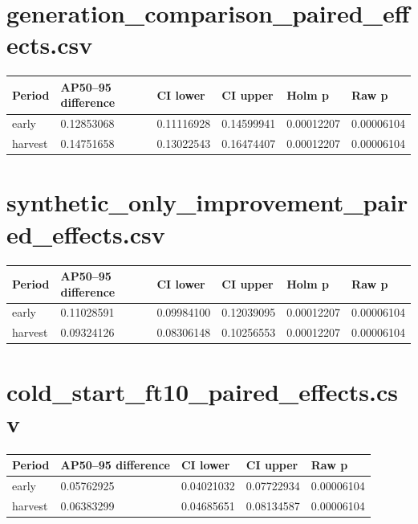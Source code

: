 \documentclass{article}
\begin{document}
\section*{generation\_comparison\_paired\_effects.csv}
\begin{lrbox}{\resulttable}\begin{tabular}{llllll}
\toprule
Period & AP50--95 difference & CI lower & CI upper & Holm p & Raw p \\
\midrule
early & 0.12853068 & 0.11116928 & 0.14599941 & 0.00012207 & 0.00006104 \\
harvest & 0.14751658 & 0.13022543 & 0.16474407 & 0.00012207 & 0.00006104 \\
\bottomrule
\end{tabular}\end{lrbox}
\noindent\ifdim\wd\resulttable>\linewidth\resizebox{.99\linewidth}{!}{\usebox{\resulttable}}\else\usebox{\resulttable}\fi
\clearpage
\section*{synthetic\_only\_improvement\_paired\_effects.csv}
\begin{lrbox}{\resulttable}\begin{tabular}{llllll}
\toprule
Period & AP50--95 difference & CI lower & CI upper & Holm p & Raw p \\
\midrule
early & 0.11028591 & 0.09984100 & 0.12039095 & 0.00012207 & 0.00006104 \\
harvest & 0.09324126 & 0.08306148 & 0.10256553 & 0.00012207 & 0.00006104 \\
\bottomrule
\end{tabular}\end{lrbox}
\noindent\ifdim\wd\resulttable>\linewidth\resizebox{.99\linewidth}{!}{\usebox{\resulttable}}\else\usebox{\resulttable}\fi
\clearpage
\section*{cold\_start\_ft10\_paired\_effects.csv}
\begin{lrbox}{\resulttable}\begin{tabular}{lllll}
\toprule
Period & AP50--95 difference & CI lower & CI upper & Raw p \\
\midrule
early & 0.05762925 & 0.04021032 & 0.07722934 & 0.00006104 \\
harvest & 0.06383299 & 0.04685651 & 0.08134587 & 0.00006104 \\
\bottomrule
\end{tabular}\end{lrbox}
\noindent\ifdim\wd\resulttable>\linewidth\resizebox{.99\linewidth}{!}{\usebox{\resulttable}}\else\usebox{\resulttable}\fi
\clearpage
\end{document}
